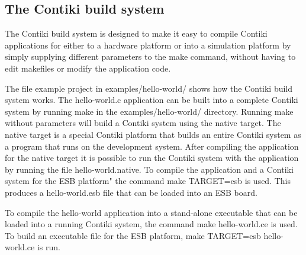 \hypertarget{a00058}{}\subsection{The Contiki build system}
\label{a00058}


The Contiki build system is designed to make it easy to compile Contiki applications for either to a hardware platform or into a simulation platform by simply supplying different parameters to the {\ttfamily make} command, without having to edit makefiles or modify the application code.

The file example project in examples/hello-\/world/ shows how the Contiki build system works. The {\ttfamily hello-\/world.\+c} application can be built into a complete Contiki system by running {\ttfamily make} in the examples/hello-\/world/ directory. Running {\ttfamily make} without parameters will build a Contiki system using the {\ttfamily native} target. The {\ttfamily native} target is a special Contiki platform that builds an entire Contiki system as a program that runs on the development system. After compiling the application for the {\ttfamily native} target it is possible to run the Contiki system with the application by running the file {\ttfamily hello-\/world.\+native}. To compile the application and a Contiki system for the E\+SB platform" the command {\ttfamily make T\+A\+R\+G\+ET=esb} is used. This produces a hello-\/world.\+esb file that can be loaded into an E\+SB board.

To compile the hello-\/world application into a stand-\/alone executable that can be loaded into a running Contiki system, the command {\ttfamily make hello-\/world.\+ce} is used. To build an executable file for the E\+SB platform, {\ttfamily make T\+A\+R\+G\+ET=esb hello-\/world.\+ce} is run.


